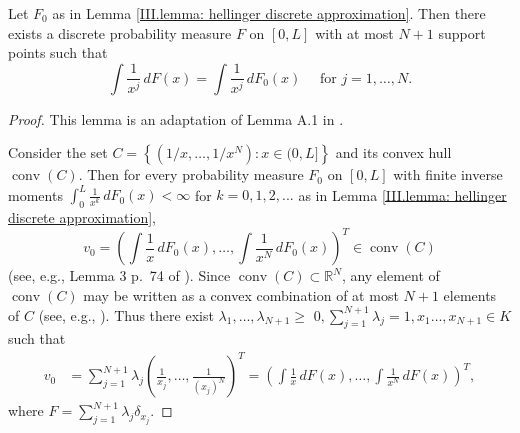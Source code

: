 \begin{lemma}\label{III.lemma: discrete supported measure}
    Let $F_0$ as in Lemma \ref{III.lemma: hellinger discrete approximation}. Then there exists a discrete probability measure $F$ on $[0,L]$ with at most $N+1$ support points such that
    $$
    \int \frac{1}{x^j} \, d F(x)=\int \frac{1}{x^j} \, d F_0(x) \quad \text { for } j=1, \ldots, N .
    $$
    \end{lemma}
    \begin{proof}
    This lemma is an adaptation of Lemma A.1 in \cite{23}. 
    
    Consider the set
    $
    C=\left\{\left(1/x, \ldots, 1/x^N \right): x \in (0,L]\right\}
    $
    and its convex hull $\operatorname{conv}(C)$. Then for every probability measure $F_0$ on $[0,L]$ with finite inverse moments $\int_{0}^L \frac{1}{x^k} \, dF_0(x) < \infty$ for $k=0,1,2,...$ as in Lemma \ref{III.lemma: hellinger discrete approximation}, 
    $$
    v_0=\left(\int \frac{1}{x} \, d F_0(x), \ldots, \int \frac{1}{x^N} \, d F_0(x)\right)^T \in \operatorname{conv}(C)
    $$
    (see, e.g., Lemma 3 p.\ 74 of \cite{28}). Since $\operatorname{conv}(C) \subset \mathbb{R}^N$, any element of $\operatorname{conv}(C)$ may be written as a convex combination of at most $N+1$ elements of $C$ (see, e.g., \cite{29}). Thus there exist $\lambda_1, \ldots, \lambda_{N+1} \geq$ $0, \sum_{j=1}^{N+1} \lambda_j=1, x_1 \ldots, x_{N+1} \in K$ such that
    $$
    \begin{aligned}
    v_0 & =\sum_{j=1}^{N+1} \lambda_j\left(\frac{1}{x_j}, \ldots, \frac{1}{(x_j)^N}\right)^T =\left(\int \frac{1}{x} \, d F(x), \ldots, \int \frac{1}{x^N} \, d F(x)\right)^T,
    \end{aligned}
    $$
    where $F=\sum_{j=1}^{N+1} \lambda_j \delta_{x_j}$.
\end{proof}


